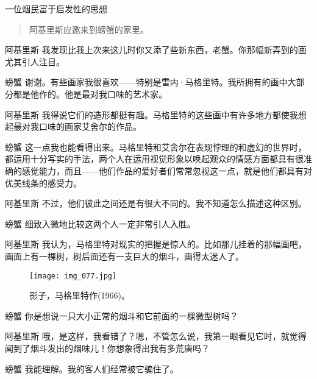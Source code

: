 
\begin{dialog}{一位烟民富于启发性的思想}

\begin{quote}
阿基里斯应邀来到螃蟹的家里。
\end{quote}

\begin{dialogue}

\item[阿基里斯]我发现比我上次来这儿时你又添了些新东西，老蟹。你那幅新弄到的画尤其引人注目。

\item[螃蟹]谢谢。有些画家我很喜欢——特别是雷内·马格里特。我所拥有的画中大部分都是他作的。他是最对我口味的艺术家。

\item[阿基里斯]我得说它们的造形都挺有趣。马格里特的这些画中有许多地方都使我想起最对我口味的画家艾舍尔的作品。

\item[螃蟹]这一点我也能看得出来。马格里特和艾舍尔在表现悖理的和虚幻的世界时，都运用十分写实的手法，两个人在运用视觉形象以唤起观众的情感方面都具有很准确的感觉能力，而且——他们作品的爱好者们常常忽视这一点，就是他们都具有对优美线条的感受力。

\item[阿基里斯]不过，他们彼此之间还是有很大不同的。我不知道怎么描述这种区别。

\item[螃蟹]细致入微地比较这两个人一定非常引人入胜。

\item[阿基里斯]我认为，马格里特对现实的把握是惊人的。比如那儿挂着的那幅画吧，画面上有一棵树，树后面还有一支巨大的烟斗，画得太迷人了。

\begin{figure}
\texttt{[image: img\_077.jpg]}
\caption[影子，马格里特作。]
  {影子，马格里特作(1966)。}
\end{figure}

\item[螃蟹]你是想说一只大小正常的烟斗和它前面的一棵微型树吗？

\item[阿基里斯]哦，是这样，我看错了？嗯，不管怎么说，我第一眼看见它时，就觉得闻到了烟斗发出的烟味儿！你想象得出我有多荒唐吗？

\item[螃蟹]我能理解。我的客人们经常被它骗住了。



\end{dialogue}
\end{dialog}
